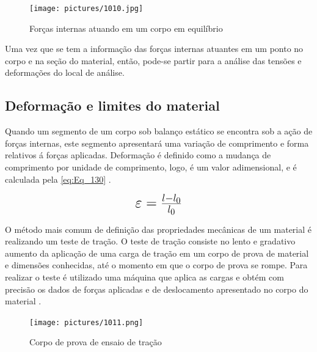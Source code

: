 \begin{figure}[htb]
	\caption{\label{fig:1010} Forças internas atuando em um corpo em equilíbrio}
	\begin{center}
		\texttt{[image: pictures/1010.jpg]}
	\end{center}
\end{figure}

Uma vez que se tem a informação das forças internas atuantes em um ponto no corpo e na seção do material, então, pode-se partir para a análise das tensões
e deformações do local de análise.

\subsection{Deformação e limites do material}

Quando um segmento de um corpo sob balanço estático se encontra sob a ação de forças internas, este segmento apresentará uma variação de comprimento e forma relativos
á forças aplicadas. Deformação é definido como a mudança de comprimento por unidade de comprimento, logo, é um valor adimensional,
e é calculada pela \autoref{eq:Eq_130} \autocite{Norton2011}.

\begin{equation}\label{eq:Eq_130}%
\mbox{\fontsize{17.28}{21.6}\selectfont\( %
\varepsilon = \frac{l - l_0}{l_0}
\)} %
\end{equation}

%
%
%

\hfill

O método mais comum de definição das propriedades mecânicas de um material é realizando um teste de tração.
O teste de tração consiste no lento e gradativo aumento da aplicação de uma carga de tração em um corpo de prova de material e dimensões conhecidas,
até o momento em que o corpo de prova se rompe.
Para realizar o teste é utilizado uma máquina que aplica as cargas e obtém com precisão os dados de forças aplicadas e de deslocamento apresentado
no corpo do material \autocite{Norton2011}.

\begin{figure}[htb]
	\caption{\label{fig:1011} Corpo de prova de ensaio de tração}
	\begin{center}
		\texttt{[image: pictures/1011.png]}
	\end{center}
\end{figure}

